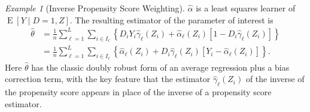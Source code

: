\documentclass[aos]{imsart}
\numberwithin{equation}{section}
\theoremstyle{plain}
\theoremstyle{remark}
\newtheorem{example}{Example}
\DeclareMathOperator{\E}{E}
\begin{document}
\begin{example}[Inverse Propensity Score Weighting\label{ex:ips}]
$\hat\alpha$ is a least squares learner of $\E[Y \mid D=1,Z]$. The resulting estimator of the parameter of interest is
\begin{align*}
\hat{\theta} &  =\frac{1}{n}\sum_{\ell=1}^{L}\sum_{i\in I_{\ell}}\left\{
D_iY_i\hat{\gamma}_{\ell}(Z_i)+\hat{\alpha}_{\ell}(Z_{i})[1-D_i\hat{\gamma
}_{\ell}(Z_i)]\right\}  \\
&
=\frac{1}{n}\sum_{\ell=1}^{L}\sum_{i\in I_{\ell}}\left\{
\hat{\alpha}_{\ell}(Z_{i})+D_i\hat{\gamma
}_{\ell}(Z_i)[Y_i-\hat{\alpha}_{\ell}(Z_{i})]\right\}.
\end{align*}
Here $\hat{\theta}$ has the classic doubly robust form \cite{robins1995semiparametric} of an average regression plus a bias correction term, with the key feature that the estimator $\hat{\gamma}_{\ell}(Z_i)$ of the inverse of the propensity score appears in place of the inverse of a propensity score estimator.
\end{example}
\end{document}
